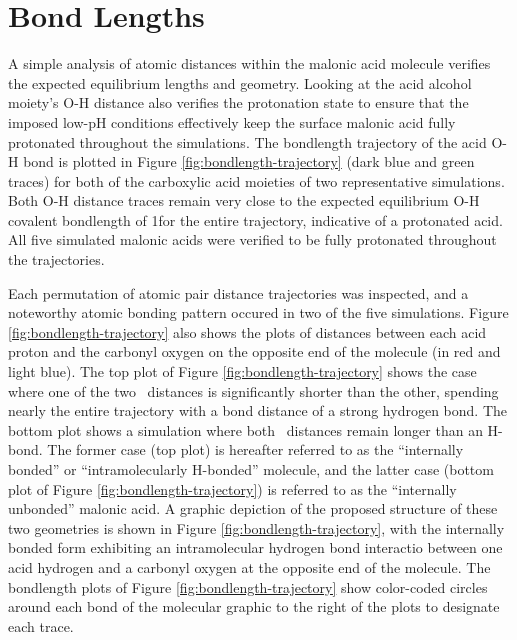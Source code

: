 \section{Bond Lengths}

A simple analysis of atomic distances within the malonic acid molecule verifies the expected equilibrium lengths and geometry. Looking at the acid alcohol moiety's O-H distance also verifies the protonation state to ensure that the imposed low-pH conditions effectively keep the surface malonic acid fully protonated throughout the simulations. The bondlength trajectory of the acid O-H bond is plotted in Figure \ref{fig:bondlength-trajectory} (dark blue and green traces) for both of the carboxylic acid moieties of two representative simulations. Both O-H distance traces remain very close to the expected equilibrium O-H covalent bondlength of 1\angs for the entire trajectory, indicative of a protonated acid. All five simulated malonic acids were verified to be fully protonated throughout the trajectories.

Each permutation of atomic pair distance trajectories was inspected, and a noteworthy atomic bonding pattern occured in two of the five simulations. Figure \ref{fig:bondlength-trajectory} also shows the plots of distances between each acid proton and the carbonyl oxygen on the opposite end of the molecule (in red and light blue). The top plot of Figure \ref{fig:bondlength-trajectory} shows the case where one of the two \ocarb~distances is significantly shorter than the other, spending nearly the entire trajectory with a bond distance of a strong hydrogen bond. The bottom plot shows a simulation where both \ocarb~distances remain longer than an H-bond. The former case (top plot) is hereafter referred to as the ``internally bonded'' or ``intramolecularly H-bonded'' molecule, and the latter case (bottom plot of Figure \ref{fig:bondlength-trajectory}) is referred to as the ``internally unbonded'' malonic acid. A graphic depiction of the proposed structure of these two geometries is shown in Figure \ref{fig:bondlength-trajectory}, with the internally bonded form exhibiting an intramolecular hydrogen bond interactio between one acid hydrogen and a carbonyl oxygen at the opposite end of the molecule. The bondlength plots of Figure \ref{fig:bondlength-trajectory} show color-coded circles around each bond of the molecular graphic to the right of the plots to designate each trace.

